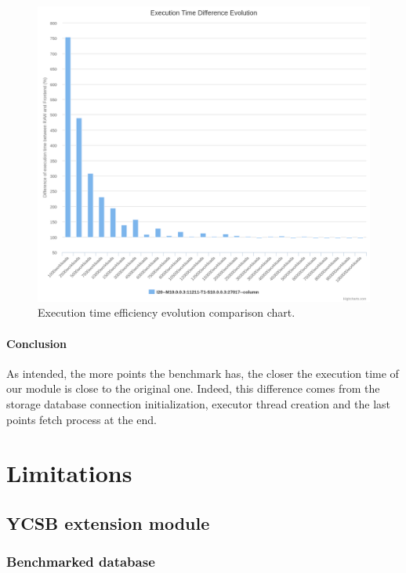 \documentclass[a4paper,11pt]{report}
\begin{document}
\begin{figure}[ht]
\begin{center}
\includegraphics[width=1\linewidth]{images/evaluation/execution_time.png}
\caption{Execution time efficiency evolution comparison chart.}
\label{execution_time}
\end{center}
\end{figure}

\paragraph{Conclusion}

As intended, the more points the benchmark has, the closer the execution time of our module is close to the original one. Indeed, this difference comes from the storage database connection initialization, executor thread creation and the last points fetch process at the end.

\clearpage

\section{Limitations}

\subsection{YCSB extension module}

\subsubsection{Benchmarked database}
\end{document}
